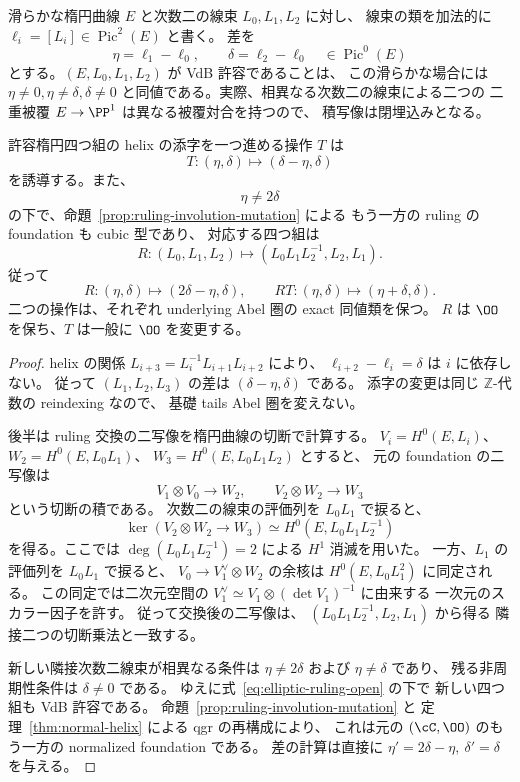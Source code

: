 滑らかな楕円曲線 $E$ と次数二の線束 $L_0,L_1,L_2$ に対し、
線束の類を加法的に $\ell_i=[L_i]\in\operatorname{Pic}^2(E)$ と書く。
差を
\[
 \eta=\ell_1-\ell_0,\qquad \delta=\ell_2-\ell_0
 \quad\in\operatorname{Pic}^0(E)
\]
とする。$(E,L_0,L_1,L_2)$ が VdB 許容であることは、
この滑らかな場合には $\eta\ne0,\eta\ne\delta,\delta\ne0$
と同値である。実際、相異なる次数二の線束による二つの
二重被覆 $E\to\PP^1$ は異なる被覆対合を持つので、
積写像は閉埋込みとなる。

\begin{lemma}[楕円四つ組の二つの反射]
\label{lem:elliptic-two-reflections}
許容楕円四つ組の helix の添字を一つ進める操作 $T$ は
\[
 T:(\eta,\delta)\longmapsto(\delta-\eta,\delta)
\]
を誘導する。また、
\[
 \eta\ne2\delta
 \tag{R-open}\label{eq:elliptic-ruling-open}
\]
の下で、命題~\ref{prop:ruling-involution-mutation} による
もう一方の ruling の foundation も cubic 型であり、
対応する四つ組は
\[
 R:(L_0,L_1,L_2)\longmapsto
 (L_0L_1L_2^{-1},L_2,L_1).
\]
従って
\[
 R:(\eta,\delta)\longmapsto(2\delta-\eta,\delta),
 \qquad RT:(\eta,\delta)\longmapsto(\eta+\delta,\delta).
\]
二つの操作は、それぞれ underlying Abel 圏の exact 同値類を保つ。
$R$ は $\OO$ を保ち、$T$ は一般に $\OO$ を変更する。
\end{lemma}
\begin{proof}
helix の関係
$L_{i+3}=L_i^{-1}L_{i+1}L_{i+2}$ により、
$\ell_{i+2}-\ell_i=\delta$ は $i$ に依存しない。
従って $(L_1,L_2,L_3)$ の差は
$(\delta-\eta,\delta)$ である。
添字の変更は同じ $\mathbb Z$-代数の reindexing なので、
基礎 tails Abel 圏を変えない。

後半は ruling 交換の二写像を楕円曲線の切断で計算する。
$V_i=H^0(E,L_i)$、$W_2=H^0(E,L_0L_1)$、
$W_3=H^0(E,L_0L_1L_2)$ とすると、
元の foundation の二写像は
\[
 V_1\otimes V_0\longrightarrow W_2,\qquad
 V_2\otimes W_2\longrightarrow W_3
\]
という切断の積である。
次数二の線束の評価列を $L_0L_1$ で捩ると、
\[
 \ker(V_2\otimes W_2\longrightarrow W_3)
 \simeq H^0(E,L_0L_1L_2^{-1})
\]
を得る。ここでは $\deg(L_0L_1L_2^{-1})=2$ による
$H^1$ 消滅を用いた。
一方、$L_1$ の評価列を $L_0L_1$ で捩ると、
$V_0\to V_1^\vee\otimes W_2$ の余核は
$H^0(E,L_0L_1^2)$ に同定される。
この同定では二次元空間の
$V_1^\vee\simeq V_1\otimes(\det V_1)^{-1}$ に由来する
一次元のスカラー因子を許す。
従って交換後の二写像は、
$(L_0L_1L_2^{-1},L_2,L_1)$ から得る
隣接二つの切断乗法と一致する。

新しい隣接次数二線束が相異なる条件は
$\eta\ne2\delta$ および $\eta\ne\delta$ であり、
残る非周期性条件は $\delta\ne0$ である。
ゆえに式~\eqref{eq:elliptic-ruling-open} の下で
新しい四つ組も VdB 許容である。
命題~\ref{prop:ruling-involution-mutation} と
定理~\ref{thm:normal-helix} による qgr の再構成により、
これは元の $(\cC,\OO)$ のもう一方の normalized foundation である。
差の計算は直接に
$\eta'=2\delta-\eta,\ \delta'=\delta$ を与える。
\end{proof}

